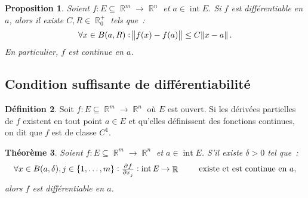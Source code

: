 \documentclass{article}
\DeclareMathOperator{\intr}{int}
\DeclareMathOperator{\R}{\mathbb R}
\newcommand{\frmrn}[2]{#1 : #2 \subseteq \R^m \to \R^n}
\newtheorem{thm}{Théorème}[section]
\newtheorem{prp}[thm]{Proposition}
\theoremstyle{definition}
\newtheorem{déf}[thm]{Définition}
\theoremstyle{remark}
\begin{document}
		\begin{prp}\label{prp:diffexistanceC} Soient $\frmrn fE$ et $a \in \intr E$. Si $f$ est différentiable en $a$, alors il existe $C, R \in  \R_0^+$ tels
		que~:
		\[\forall x \in B(a, R) : \norm{f(x)-f(a)} \leq C\norm{x-a}.\]
		En particulier, $f$ est continue en $a$.
		\end{prp}

	\subsection{Condition suffisante de différentiabilité}
		\begin{déf} Soit $\frmrn fE$ où $E$ est ouvert. Si les dérivées partielles de $f$ existent en tout point $a \in E$ et qu'elles définissent des fonctions
		continues, on dit que $f$ est de classe $C^1$.
		\end{déf}

		\begin{thm}\label{thm:diffssipdcont} Soient $\frmrn fE$ et $a \in \intr E$. S'il existe $\delta > 0$ tel que~:
		\[\forall x \in B(a, \delta), j \in \{1, \dotsc, m\} : \pd f{x_j} : \intr E \to \R\qquad\text{ existe et est continue en $a$},\]
		alors $f$ est différentiable en $a$.
		\end{thm}
\end{document}
